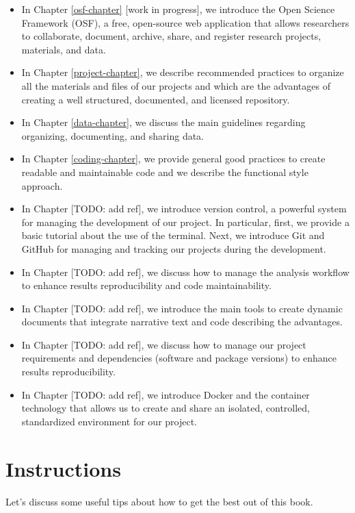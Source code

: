 \documentclass[
  11pt,
]{book}
\providecommand{\tightlist}{%
  \setlength{\itemsep}{0pt}\setlength{\parskip}{0pt}}
\begin{document}
\begin{itemize}
\tightlist
\item
  In Chapter \ref{osf-chapter} {[}work in progress{]}, we introduce the Open Science Framework (OSF), a free, open-source web application that allows researchers to collaborate, document, archive, share, and register research projects, materials, and data.
\item
  In Chapter \ref{project-chapter}, we describe recommended practices to organize all the materials and files of our projects and which are the advantages of creating a well structured, documented, and licensed repository.
\item
  In Chapter \ref{data-chapter}, we discuss the main guidelines regarding organizing, documenting, and sharing data.
\item
  In Chapter \ref{coding-chapter}, we provide general good practices to create readable and maintainable code and we describe the functional style approach.
\item
  In Chapter {[}TODO: add ref{]}, we introduce version control, a powerful system for managing the development of our project. In particular, first, we provide a basic tutorial about the use of the terminal. Next, we introduce Git and GitHub for managing and tracking our projects during the development.
\item
  In Chapter {[}TODO: add ref{]}, we discuss how to manage the analysis workflow to enhance results reproducibility and code maintainability.
\item
  In Chapter {[}TODO: add ref{]}, we introduce the main tools to create dynamic documents that integrate narrative text and code describing the advantages.
\item
  In Chapter {[}TODO: add ref{]}, we discuss how to manage our project requirements and dependencies (software and package versions) to enhance results reproducibility.
\item
  In Chapter {[}TODO: add ref{]}, we introduce Docker and the container technology that allows us to create and share an isolated, controlled, standardized environment for our project.
\end{itemize}

\hypertarget{instructions}{%
\section{Instructions}\label{instructions}}

Let's discuss some useful tips about how to get the best out of this book.
\end{document}
